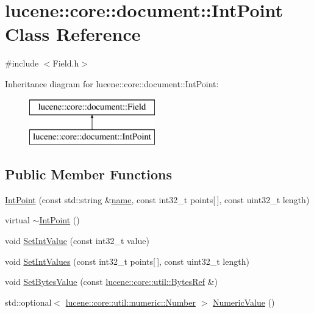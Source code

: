 \hypertarget{classlucene_1_1core_1_1document_1_1IntPoint}{}\section{lucene\+:\+:core\+:\+:document\+:\+:Int\+Point Class Reference}
\label{classlucene_1_1core_1_1document_1_1IntPoint}


{\ttfamily \#include $<$Field.\+h$>$}

Inheritance diagram for lucene\+:\+:core\+:\+:document\+:\+:Int\+Point\+:\begin{figure}[H]
\begin{center}
\leavevmode
\includegraphics[height=2.000000cm]{classlucene_1_1core_1_1document_1_1IntPoint}
\end{center}
\end{figure}
\subsection*{Public Member Functions}
\begin{DoxyCompactItemize}
\item 
\mbox{\hyperlink{classlucene_1_1core_1_1document_1_1IntPoint_aa133857ccc70fbb2b8933d5ecaa46fb5}{Int\+Point}} (const std\+::string \&\mbox{\hyperlink{classlucene_1_1core_1_1document_1_1Field_a52f673f3b3abb14b180f5159f4726537}{name}}, const int32\+\_\+t points\mbox{[}$\,$\mbox{]}, const uint32\+\_\+t length)
\item 
virtual \mbox{\hyperlink{classlucene_1_1core_1_1document_1_1IntPoint_ab5b682c697ecaf6a3c4081c786944b60}{$\sim$\+Int\+Point}} ()
\item 
void \mbox{\hyperlink{classlucene_1_1core_1_1document_1_1IntPoint_a49cd2286ec4ffa46d868eea812d85234}{Set\+Int\+Value}} (const int32\+\_\+t value)
\item 
void \mbox{\hyperlink{classlucene_1_1core_1_1document_1_1IntPoint_a880e94ed4c6162b469cc23846ea8bc2e}{Set\+Int\+Values}} (const int32\+\_\+t points\mbox{[}$\,$\mbox{]}, const uint32\+\_\+t length)
\item 
void \mbox{\hyperlink{classlucene_1_1core_1_1document_1_1IntPoint_a288c85e2568bf186de1dac119c91ae2f}{Set\+Bytes\+Value}} (const \mbox{\hyperlink{classlucene_1_1core_1_1util_1_1BytesRef}{lucene\+::core\+::util\+::\+Bytes\+Ref}} \&)
\item 
std\+::optional$<$ \mbox{\hyperlink{classlucene_1_1core_1_1util_1_1numeric_1_1Number}{lucene\+::core\+::util\+::numeric\+::\+Number}} $>$ \mbox{\hyperlink{classlucene_1_1core_1_1document_1_1IntPoint_a738e9e2cc41c77f835aac8f06da801ac}{Numeric\+Value}} ()
\end{DoxyCompactItemize}
